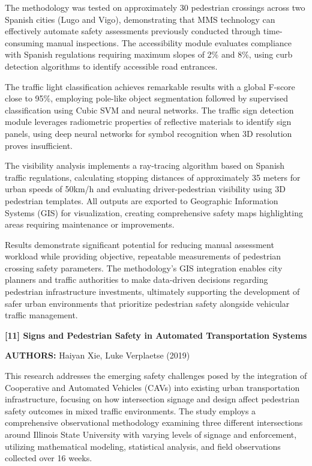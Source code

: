 \documentclass[a4paper, 12pt]{report}
\begin{document}
The methodology was tested on approximately 30 pedestrian crossings across two Spanish cities (Lugo and Vigo), demonstrating that MMS technology can effectively automate safety assessments previously conducted through time-consuming manual inspections. The accessibility module evaluates compliance with Spanish regulations requiring maximum slopes of 2\% and 8\%, using curb detection algorithms to identify accessible road entrances.

The traffic light classification achieves remarkable results with a global F-score close to 95\%, employing pole-like object segmentation followed by supervised classification using Cubic SVM and neural networks. The traffic sign detection module leverages radiometric properties of reflective materials to identify sign panels, using deep neural networks for symbol recognition when 3D resolution proves insufficient.

The visibility analysis implements a ray-tracing algorithm based on Spanish traffic regulations, calculating stopping distances of approximately 35 meters for urban speeds of 50km/h and evaluating driver-pedestrian visibility using 3D pedestrian templates. All outputs are exported to Geographic Information Systems (GIS) for visualization, creating comprehensive safety maps highlighting areas requiring maintenance or improvements.

Results demonstrate significant potential for reducing manual assessment workload while providing objective, repeatable measurements of pedestrian crossing safety parameters. The methodology's GIS integration enables city planners and traffic authorities to make data-driven decisions regarding pedestrian infrastructure investments, ultimately supporting the development of safer urban environments that prioritize pedestrian safety alongside vehicular traffic management.

\noindent \textbf{[11] Signs and Pedestrian Safety in Automated Transportation Systems}

\textbf{AUTHORS:} Haiyan Xie, Luke Verplaetse (2019)


This research addresses the emerging safety challenges posed by the integration of Cooperative and Automated Vehicles (CAVs) into existing urban transportation infrastructure, focusing on how intersection signage and design affect pedestrian safety outcomes in mixed traffic environments. The study employs a comprehensive observational methodology examining three different intersections around Illinois State University with varying levels of signage and enforcement, utilizing mathematical modeling, statistical analysis, and field observations collected over 16 weeks.
\end{document}
